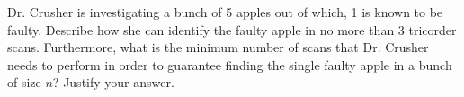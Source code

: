 \documentclass[a4paper]{exam}
\begin{document}
\begin{questions}
  Dr. Crusher is investigating a bunch of 5 apples out of which, 1 is known to be faulty. Describe how she can identify the faulty apple in no more than 3 tricorder scans. Furthermore, what is the minimum number of scans that Dr. Crusher needs to perform in order to guarantee finding the single faulty apple in a bunch of size $n$? Justify your answer.

  \begin{solution}
    \end{solution}


      
\end{questions}
\end{document}

